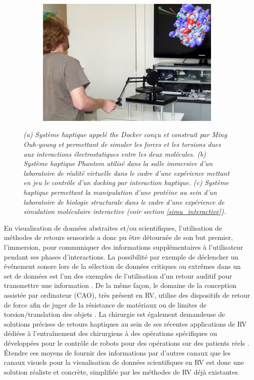 \begin{figure}[h]
\begin{subfigure}{.33\textwidth}
  {\includegraphics[width=0.9\linewidth]{./figures/ch2/ferey_haptic}}
    \caption{}
    \label{Fig:ferey_haptic}
  \end{subfigure}
  \caption[Système haptique \textit{the Docker}. (b) Système haptique Phantom. (c) Système haptique permettant la manipulation d'une protéine.]{\it (a) Système haptique appelé \textit{the Docker} conçu et construit par Ming Ouh-young et permettant de simuler les forces et les torsions dues aux interactions électrostatiques entre les deux molécules.
  (b) Système haptique Phantom utilisé dans la salle immersive d'un laboratoire de réalité virtuelle dans le cadre d'une expérience mettant en jeu le contrôle d'un docking par interaction haptique. 
  (c) Système haptique permettant la manipulation d'une protéine au sein d'un laboratoire de biologie structurale dans le cadre d'une expérience de simulation moléculaire interactive (voir section \ref{simu_interactive}).
  }
\end{figure}

En visualisation de données abstraites et/ou scientifiques, l'utilisation de méthodes de retours sensoriels a donc pu être détournée de son but premier, l'immersion, pour communiquer des informations supplémentaires à l'utilisateur pendant ses phases d'interactions. La possibilité par exemple de déclencher un événement sonore lors de la sélection de données critiques ou extrêmes dans un set de données est l'un des exemples de l'utilisation d'un retour auditif pour transmettre une information \cite{ferey_multisensory_2009}. De la même façon, le domaine de la conception assistée par ordinateur (CAO), très présent en RV, utilise des dispositifs de retour de force afin de juger de la résistance de matériaux ou de limites de torsion/translation des objets \cite{sun2010haptic}. La chirurgie est également demandeuse de solutions précises de retours haptiques au sein de ses récentes applications de RV dédiées à l’entraînement des chirurgiens à des opérations spécifiques ou développées pour le contrôle de robots pour des opérations sur des patients réels \cite{kusumoto_application_2006}. Étendre ces moyens de fournir des informations par d'autres canaux que les canaux visuels pour la visualisation de données scientifiques en RV est donc une solution réaliste et concrète, simplifiée par les méthodes de RV déjà existantes.

